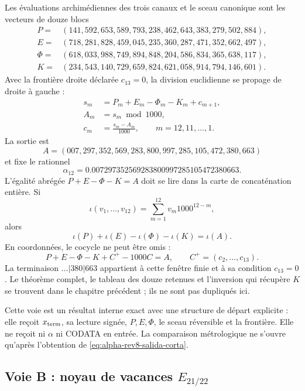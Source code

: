 Les évaluations archimédiennes des trois canaux et le sceau canonique sont
les vecteurs de douze blocs
\[
\begin{aligned}
P={}&(141,592,653,589,793,238,462,643,383,279,502,884),\\
E={}&(718,281,828,459,045,235,360,287,471,352,662,497),\\
\Phi={}&(618,033,988,749,894,848,204,586,834,365,638,117),\\
K={}&(234,543,140,729,659,824,621,058,914,794,146,601).
\end{aligned}
\]
Avec la frontière droite déclarée \(c_{13}=0\), la division euclidienne se
propage de droite à gauche :
\begin{equation}
\begin{aligned}
 s_m&=P_m+E_m-\Phi_m-K_m+c_{m+1},\\
 A_m&=s_m\bmod 1000,\\
 c_m&=\frac{s_m-A_m}{1000},
 \qquad m=12,11,\ldots,1.
\end{aligned}
\label{eq:alpha-rev8-via-entera}
\end{equation}
La sortie est
\[
 A=(007,297,352,569,283,800,997,285,105,472,380,663)
\]
et fixe le rationnel
\begin{equation}
 \alpha_{12}
 =0.007297352569283800997285105472380663.
 \label{eq:alpha-rev8-salida-corta}
\end{equation}
L’égalité abrégée \(P+E-\Phi-K=A\) doit se lire dans la carte de
concaténation entière. Si
\[
 \iota(v_1,\ldots,v_{12})
 =\sum_{m=1}^{12}v_m1000^{12-m},
\]
alors
\begin{equation}
 \boxed{\iota(P)+\iota(E)-\iota(\Phi)-\iota(K)=\iota(A)}.
 \label{eq:alpha-rev8-identidad-concatenada}
\end{equation}
En coordonnées, le cocycle ne peut être omis :
\[
 P+E-\Phi-K+C^+-1000C=A,
 \qquad C^+=(c_2,\ldots,c_{13}).
\]
La terminaison \(\ldots|380|663\) appartient à cette fenêtre finie et à sa
condition \(c_{13}=0\). Le théorème complet, le tableau des douze retenues et
l’inversion qui récupère \(K\) se trouvent dans le chapitre précédent ; ils ne sont pas
dupliqués ici.

Cette voie est un résultat interne exact avec une structure de départ explicite :
elle reçoit \(x_{\rm term}\), sa lecture signée, \(P,E,\Phi\), le sceau réversible
et la frontière. Elle ne reçoit ni \(\alpha\) ni CODATA en entrée. La comparaison
métrologique ne s’ouvre qu’après l’obtention de \eqref{eq:alpha-rev8-salida-corta}.

\subsection{Voie B : noyau de vacances \texorpdfstring{\(E_{21/22}\)}{E21/22}}

